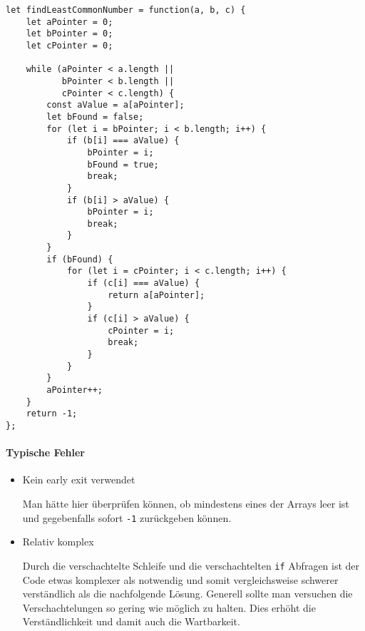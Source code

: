 \documentclass{book}
\begin{document}
\begin{lstlisting}[caption=My Javascript Example]
let findLeastCommonNumber = function(a, b, c) {
	let aPointer = 0;
	let bPointer = 0;
	let cPointer = 0;
	
	while (aPointer < a.length ||
		   bPointer < b.length || 
		   cPointer < c.length) {
		const aValue = a[aPointer];
		let bFound = false;
		for (let i = bPointer; i < b.length; i++) {
			if (b[i] === aValue) {
				bPointer = i;
				bFound = true;
				break;
			}
			if (b[i] > aValue) {
				bPointer = i;
				break;
			}
		}
		if (bFound) {
			for (let i = cPointer; i < c.length; i++) {
				if (c[i] === aValue) {
					return a[aPointer];
				}
				if (c[i] > aValue) {
					cPointer = i;
					break;
				}
			}
		}
		aPointer++;
	}
	return -1;
};
\end{lstlisting}

\paragraph{Typische Fehler}
\begin{itemize} 
	\item Kein early exit verwendet
	
	Man hätte hier überprüfen können, ob mindestens eines der Arrays leer ist und gegebenfalls sofort \lstinline|-1| zurückgeben können.
	
	\item Relativ komplex
	
	Durch die verschachtelte Schleife und die verschachtelten \lstinline|if| Abfragen ist der Code etwas komplexer als notwendig und somit vergleichsweise schwerer verständlich als die nachfolgende Lösung. Generell sollte man versuchen die Verschachtelungen so gering wie möglich zu halten. Dies erhöht die Verständlichkeit und damit auch die Wartbarkeit.
	
\end{itemize}
\end{document}
